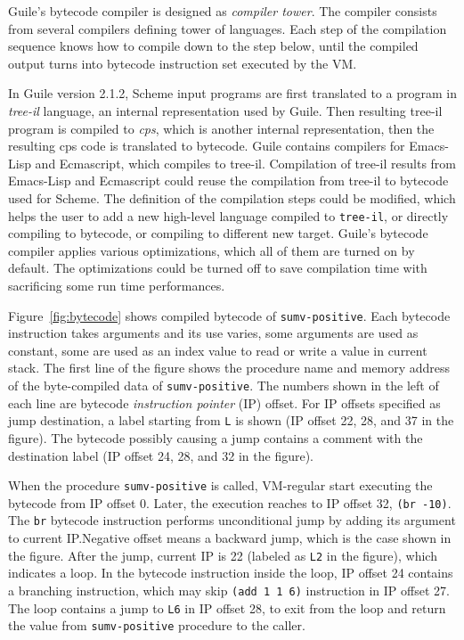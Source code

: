 \documentclass[preprint, 10pt]{sigplanconf}
\begin{document}
Guile's bytecode compiler is designed as \textit{compiler tower}. The compiler
consists from several compilers defining tower of languages. Each step of the
compilation sequence knows how to compile down to the step below, until the
compiled output turns into bytecode instruction set executed by the VM.\@

In Guile version 2.1.2, Scheme input programs are first translated to a
program in \textit{tree-il} language, an internal representation used by
Guile. Then resulting tree-il program is compiled to \textit{cps}, which is
another internal representation, then the resulting cps code is translated to
bytecode. Guile contains compilers for Emacs-Lisp and Ecmascript, which
compiles to tree-il. Compilation of tree-il results from Emacs-Lisp and
Ecmascript could reuse the compilation from tree-il to bytecode used for
Scheme. The definition of the compilation steps could be modified, which helps
the user to add a new high-level language compiled to \texttt{tree-il}, or
directly compiling to bytecode, or compiling to different new target. Guile's
bytecode compiler applies various optimizations, which all of them are turned
on by default. The optimizations could be turned off to save compilation time
with sacrificing some run time performances.

Figure~\hyperref[fig:bytecode]{\ref{fig:bytecode}} shows compiled bytecode of
\texttt{sumv-positive}. Each bytecode instruction takes arguments and its use
varies, some arguments are used as constant, some are used as an index value
to read or write a value in current stack. The first line of the figure shows
the procedure name and memory address of the byte-compiled data of
\texttt{sumv-positive}. The numbers shown in the left of each line are
bytecode \textit{instruction pointer} (IP) offset. For IP offsets specified as
jump destination, a label starting from \texttt{L} is shown (IP offset 22, 28,
and 37 in the figure). The bytecode possibly causing a jump contains a comment
with the destination label (IP offset 24, 28, and 32 in the figure).

When the procedure \texttt{sumv-positive} is called, VM-regular start
executing the bytecode from IP offset 0. Later, the execution reaches to IP
offset 32, \texttt{(br -10)}. The \texttt{br} bytecode instruction performs
unconditional jump by adding its argument to current IP.\@ Negative offset
means a backward jump, which is the case shown in the figure. After the jump,
current IP is 22 (labeled as \texttt{L2} in the figure), which indicates a
loop. In the bytecode instruction inside the loop, IP offset 24 contains a
branching instruction, which may skip \texttt{(add 1 1 6)} instruction in IP
offset 27. The loop contains a jump to \texttt{L6} in IP offset 28, to exit
from the loop and return the value from \texttt{sumv-positive} procedure to
the caller.
\end{document}
